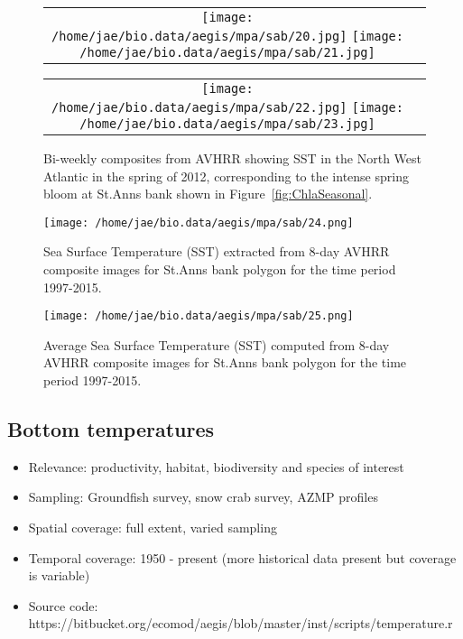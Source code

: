 \documentclass[letterpaper,portrait,11pt]{scrartcl}
\numberwithin{equation}{section}    %
\numberwithin{figure}{section}    %
\numberwithin{table}{section}       %
\begin{document}
\begin{figure}[h]
  \centering
  \begin{tabular}{cc}
    \texttt{[image: /home/jae/bio.data/aegis/mpa/sab/20.jpg]}
    \texttt{[image: /home/jae/bio.data/aegis/mpa/sab/21.jpg]} 
  \end{tabular}
  \begin{tabular}{cc}
    \texttt{[image: /home/jae/bio.data/aegis/mpa/sab/22.jpg]}
    \texttt{[image: /home/jae/bio.data/aegis/mpa/sab/23.jpg]}
  \end{tabular}
  \caption{Bi-weekly composites from AVHRR showing SST in the North West Atlantic in the spring of 2012, corresponding to the intense spring bloom at St.Anns bank shown in Figure~\ref{fig:ChlaSeasonal}.}
  \label{fig:SSTfromAVHRRmap}
\end{figure}

\begin{figure}[h]
  \centering
  \texttt{[image: /home/jae/bio.data/aegis/mpa/sab/24.png]}
  \caption{Sea Surface Temperature (SST) extracted from 8-day AVHRR composite images for St.Anns bank polygon for the time period 1997-2015.}
  \label{fig:SSTfromAVHRRts}
\end{figure}

\begin{figure}[h]

  \centering
  \texttt{[image: /home/jae/bio.data/aegis/mpa/sab/25.png]}
  \caption{Average Sea Surface Temperature (SST) computed from 8-day AVHRR composite images for St.Anns bank polygon for the time period 1997-2015.}
  \label{fig:SstSeasonal}
\end{figure}


\afterpage{\clearpage}
\subsection{Bottom temperatures}

\begin{itemize}
  \item Relevance:  productivity, habitat, biodiversity and species of interest
  \item Sampling:  Groundfish survey, snow crab survey, AZMP profiles 
  \item Spatial coverage: full extent, varied sampling
  \item Temporal coverage: 1950 - present (more historical data present but coverage is variable)
  \item Source code: https://bitbucket.org/ecomod/aegis/blob/master/inst/scripts/temperature.r
\end{itemize}
\end{document}

